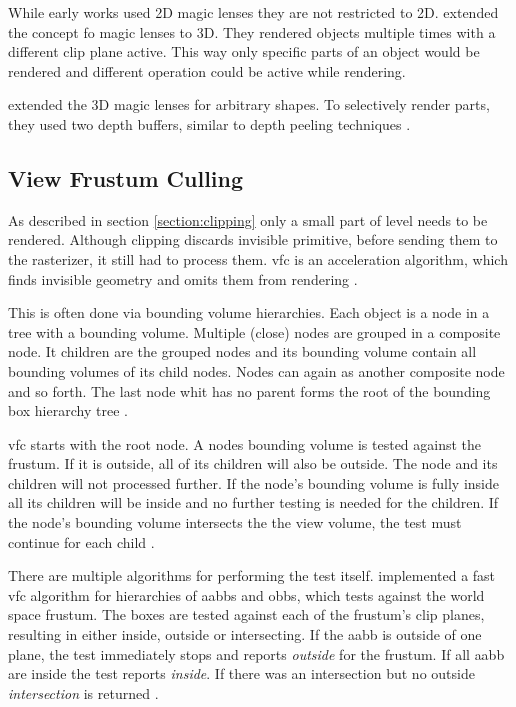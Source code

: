 While early works used 2D magic lenses \cite{bier:1993:toolglass} they are not restricted to 2D. \textcite{viega:1996:3d} extended the concept fo magic lenses to 3D. They  rendered objects multiple times with a different clip plane active. This way only specific parts of an object would be rendered and different operation could be active while rendering.

\textcite{ropinski:2004:real} extended the 3D magic lenses for arbitrary shapes. To selectively render parts, they used two depth buffers, similar to depth peeling techniques \cite{everitt:2001:interactive}.

\subsection{View Frustum Culling}
As described in section \ref{section:clipping} only a small part of level needs to be rendered. Although clipping discards invisible primitive, before sending them to the rasterizer, it still had to process them. \Gls{vfc} is an acceleration algorithm, which finds invisible geometry and omits them from rendering \cite{assarsson:2000:optimized, akine:2018:realtime}.

This is often done via bounding volume hierarchies. Each object is a node in a tree with a bounding volume. Multiple (close) nodes are grouped in a composite node. It children are the grouped nodes and its bounding volume contain all bounding volumes of its child nodes. Nodes can again as another composite node and so forth. The last node whit has no parent forms the root of the bounding box hierarchy tree \cite{clark:1976:hierarchical, assarsson:2000:optimized, akine:2018:realtime}.

\gls{vfc} starts with the root node. A nodes bounding volume is tested against the frustum. If it is outside, all of its children will also be outside. The node and its children will not processed further. If the node's bounding volume is fully inside all its children will be inside and no further testing is needed for the children. If the node's bounding volume intersects the the view volume, the test must continue for each child \cite{akine:2018:realtime}.

There are multiple algorithms for performing the test itself. \textcite{assarsson:2000:optimized} implemented a fast \gls{vfc} algorithm for hierarchies of \glspl{aabb} and \glspl{obb}, which tests against the world space frustum. The boxes are tested against each of the frustum's clip planes, resulting in either inside, outside or intersecting. If the \gls{aabb} is outside of one plane, the test immediately stops and reports \textit{outside} for the frustum. If all \gls{aabb} are inside the test reports \textit{inside}. If there was an intersection but no outside \textit{intersection} is returned \cite{assarsson:2000:optimized}.

